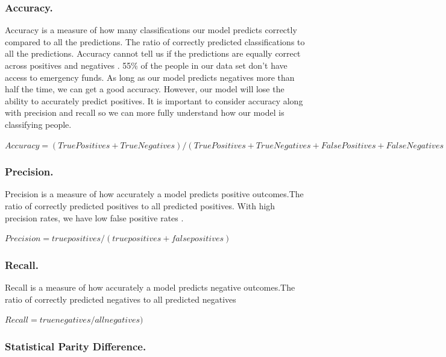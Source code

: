 \documentclass[water,article,submit,moreauthors,pdftex]{mdpi}
\begin{document}
\hypertarget{accuracy.}{%
\subsubsection{Accuracy.}\label{accuracy.}}

Accuracy is a measure of how many classifications our model predicts
correctly compared to all the predictions. The ratio of correctly
predicted classifications to all the predictions. Accuracy cannot tell
us if the predictions are equally correct across positives and negatives
\citep{juba2019precision, gupta2021recall}. 55\% of the people in our
data set don't have access to emergency funds. As long as our model
predicts negatives more than half the time, we can get a good accuracy.
However, our model will lose the ability to accurately predict
positives. It is important to consider accuracy along with precision and
recall so we can more fully understand how our model is classifying
people.

\(Accuracy = (True Positives + True Negatives) / (True Positives + True Negatives + False Positives + False Negatives)\)

\hypertarget{precision.}{%
\subsubsection{Precision.}\label{precision.}}

Precision is a measure of how accurately a model predicts positive
outcomes.The ratio of correctly predicted positives to all predicted
positives. With high precision rates, we have low false positive rates
\citep{juba2019precision, gupta2021recall}.

\(Precision = true positives / (true positives + false positives)\)

\hypertarget{recall.}{%
\subsubsection{Recall.}\label{recall.}}

Recall is a measure of how accurately a model predicts negative
outcomes.The ratio of correctly predicted negatives to all predicted
negatives\citep{gupta2021recall}

\(Recall = true negatives / all negatives)\)

\hypertarget{statistical-parity-difference.}{%
\subsubsection{Statistical Parity
Difference.}\label{statistical-parity-difference.}}
\end{document}
